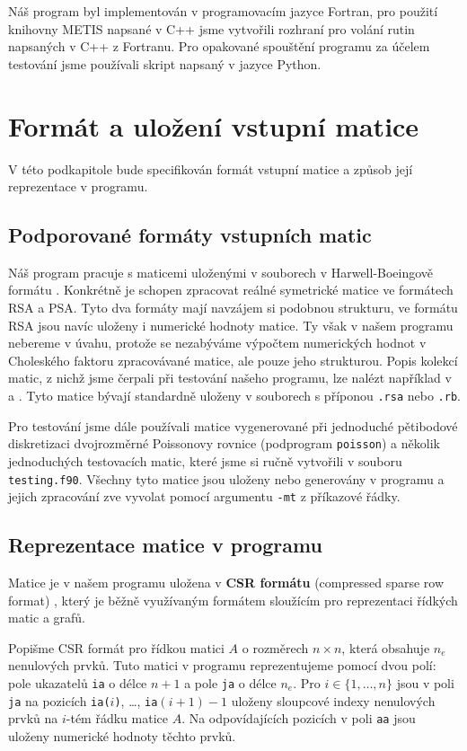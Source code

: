 \documentclass[11pt,american,czech,oneside]{book}
\theoremstyle{plain}
\theoremstyle{definition}
\begin{document}
Náš program byl implementován v programovacím jazyce Fortran, pro použití knihovny METIS napsané v C++ jsme vytvořili rozhraní pro volání rutin napsaných v C++ z Fortranu. Pro opakované spouštění programu za účelem testování jsme používali skript napsaný v jazyce Python.

\section{Formát a uložení vstupní matice}
V této podkapitole bude specifikován formát vstupní matice a způsob její reprezentace v programu.

\subsection{Podporované formáty vstupních matic}

Náš program pracuje s maticemi uloženými v souborech v Harwell-Boeingově formátu \cite{bopo:97}. Konkrétně je schopen zpracovat reálné symetrické matice ve formátech RSA a PSA. Tyto dva formáty mají navzájem si podobnou strukturu, ve formátu RSA jsou navíc uloženy i numerické hodnoty matice. Ty však v našem programu nebereme v úvahu, protože se nezabýváme výpočtem numerických hodnot v Choleského faktoru zpracovávané matice, ale pouze jeho strukturou. Popis kolekcí matic, z nichž jsme čerpali při testování našeho programu, lze nalézt například v \cite{ssmcol} a \cite{hbcol}. Tyto matice bývají standardně uloženy v souborech s příponou \texttt{.rsa} nebo \texttt{.rb}.

Pro testování jsme dále používali matice vygenerované při jednoduché pětibodové diskretizaci dvojrozměrné Poissonovy rovnice (podprogram \texttt{poisson}) a několik jednoduchých testovacích matic, které jsme si ručně vytvořili v souboru \texttt{testing.f90}. Všechny tyto matice jsou uloženy nebo generovány v programu a jejich zpracování zve vyvolat pomocí argumentu \texttt{-mt} z příkazové řádky.

\subsection{Reprezentace matice v programu}
\label{matrixProgReprez}

Matice je v našem programu uložena v \textbf{CSR formátu} (compressed sparse row format) \cite{pis:84,saad:94}, který je běžně využívaným formátem sloužícím pro reprezentaci řídkých matic a grafů.

Popišme CSR formát pro řídkou matici $A$ o rozměrech $n \times n$, která obsahuje $n_e$ nenulových prvků. Tuto matici v programu reprezentujeme pomocí dvou polí: pole ukazatelů \texttt{ia} o délce $n+1$ a pole \texttt{ja} o délce $n_e$. Pro $i\in\{1,\ldots,n\}$ jsou v poli \texttt{ja} na pozicích \texttt{ia($i$)}, \ldots, \texttt{ia$(i+1)-1$} uloženy sloupcové indexy nenulových prvků na $i$-tém řádku matice $A$. Na odpovídajících pozicích v poli \texttt{aa} jsou uloženy numerické hodnoty těchto prvků.
\end{document}
